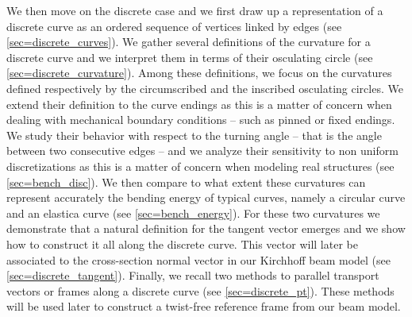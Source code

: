 We then move on the discrete case and we first draw up a representation of a discrete curve as an ordered sequence of vertices linked by edges (see \cref{sec=discrete_curves}). We gather several definitions of the curvature for a discrete curve and we interpret them in terms of their osculating circle (see \cref{sec=discrete_curvature}). Among these definitions, we focus on the curvatures defined respectively by the circumscribed and the inscribed osculating circles. We extend their definition to the curve endings as this is a matter of concern when dealing with mechanical boundary conditions -- such as pinned or fixed endings. We study their behavior with respect to the turning angle -- that is the angle between two consecutive edges -- and we analyze their sensitivity to non uniform discretizations as this is a matter of concern when modeling real structures (see \cref{sec=bench_disc}). We then compare to what extent these curvatures can represent accurately the bending energy of typical curves, namely a circular curve and an elastica curve (see \cref{sec=bench_energy}). For these two curvatures we demonstrate that a natural definition for the tangent vector emerges and we show how to construct it all along the discrete curve. This vector will later be associated to the cross-section normal vector in our Kirchhoff beam model (see \cref{sec=discrete_tangent}). Finally, we recall two methods to parallel transport vectors or frames along a discrete curve (see \cref{sec=discrete_pt}). These methods will be used later to construct a twist-free reference frame from our beam model.

